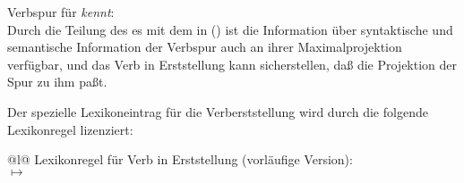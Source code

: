 \eas
Verbspur für \emph{kennt}:\\
\label{le-verbspur-kennt}%
\samepage
{}
\zs
Durch die Teilung des \localw{}es mit dem \dslw in () ist die Information
über syntaktische und semantische Information der Verbspur auch an ihrer Maximalprojektion
verfügbar, und das Verb in Erststellung kann sicherstellen, daß die Projektion der Spur zu ihm paßt.

Der spezielle Lexikoneintrag für die Verberststellung wird durch die folgende
Lexikonregel lizenziert:
\eas
\label{lr-verb-movement}
\begin{tabular}[t]{@{}l@{}}
Lexikonregel für Verb in Erststellung (vorläufige Version):\\
 $\mapsto$\\
\end{tabular}
\zs


